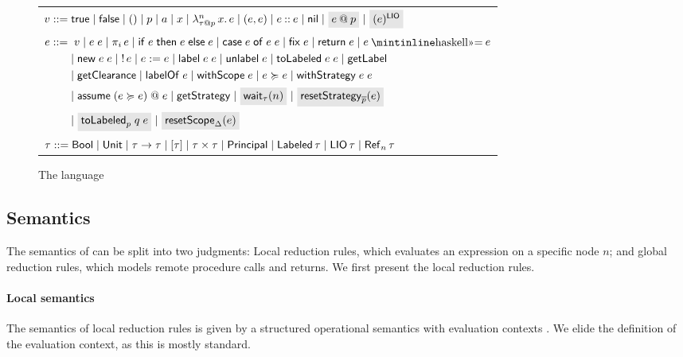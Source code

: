 \begin{figure*}
    \centering
    \begin{tabular}{l}
         $\val ::= \true \mid \false \mid () \mid p \mid \addr \mid x \mid \abs{n}{\lb{p}{\type}}{x}{\expr} \mid (\expr, \expr) \mid \cons{\expr}{\expr} \mid \nil \mid \graybox{\lb{p}{\expr}} \mid \graybox{\lio{\expr}}$ \\
         $\begin{aligned}[t]
         \expr ::=&\;\; \val \mid \app{\expr}{\expr} \mid \proj{i}{\expr} \mid \ifexpr{\expr}{\expr}{\expr} \mid \case{\expr}{\expr}{\expr} \mid \fix{\expr} \mid \return{\expr} \mid \bind{\expr}{\expr} \\ &\mid
         \new{\expr}{\expr} \mid \readref{\expr} \mid \writeref{\expr}{\expr} \mid \Label{\expr}{\expr} \mid \unlabel{\expr} \mid
         \tolabeled{\expr}{\expr} \mid \getlabel \\ &\mid \getclearance \mid \labelof{\expr} \mid \withscope{\expr} \mid \expr \actsfor \expr \mid \withstrategy{\expr}{\expr} \\ &\mid \adddelegate{\expr}{\expr}{\expr} \mid \getstrategy \mid \graybox{\wait{n}[\type]} \mid \graybox{\resetstrategy{\overline{p}}{\expr}} \\ &\mid \graybox{\resetTolabeled{p}{q}{\expr}} \mid \graybox{\resetscope{\scope}{\expr}}
         \end{aligned}$ \\
         $\type ::= \bool \mid \unit \mid \func{\type}{\type} \mid \listtype{\type} \mid \pair{\type}{\type} \mid \labeltype \mid \labeled{\type} \mid \liotype{\type} \mid \reftype[n]{\type}$ \\
    \end{tabular}
    \caption{The \lang{} language}
    \label{fig:language-syntax}
\end{figure*}

\subsection{Semantics}
The semantics of \lang{} can be split into two judgments: Local reduction rules, which evaluates an expression on a specific node $n$; and global reduction rules, which models remote procedure calls and returns. We first present the local reduction rules.

\paragraph{Local semantics}
The semantics of local reduction rules is given by a structured operational semantics with evaluation contexts \cite{Felleisen:1988:TPF:73560.73576}. We elide the definition of the evaluation context, as this is mostly standard.


